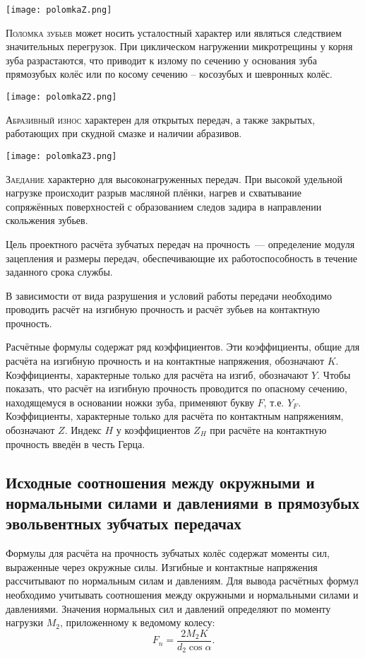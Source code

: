 \begin{marginfigure}
	\texttt{[image: polomkaZ.png]}
\end{marginfigure}
\textsc{Поломка зубьев} может носить усталостный характер или являться следствием значительных перегрузок. При циклическом нагружении микротрещины у корня зуба разрастаются, что приводит к излому по сечению у основания зуба прямозубых колёс или по косому сечению – косозубых и шевронных колёс.

\begin{marginfigure}
	\texttt{[image: polomkaZ2.png]}
\end{marginfigure}
\textsc{Абразивный износ} характерен для открытых передач, а также закрытых, работающих при скудной смазке и наличии абразивов.

\begin{marginfigure}
	\texttt{[image: polomkaZ3.png]}
\end{marginfigure}
\textsc{Заедание} характерно для высоконагруженных передач. При высокой удельной нагрузке происходит разрыв масляной плёнки, нагрев и схватывание сопряжённых поверхностей с образованием следов задира в направлении скольжения зубьев.

Цель проектного расчёта зубчатых передач на прочность~--- определение модуля зацепления и размеры передач, обеспечивающие их работоспособность в течение заданного срока службы. 

В зависимости от вида разрушения и условий работы передачи необходимо проводить расчёт на изгибную прочность и расчёт зубьев на контактную прочность.

Расчётные формулы содержат ряд коэффициентов.
Эти коэффициенты, общие для расчёта на изгибную прочность и на контактные напряжения, обозначают $ K $.
Коэффициенты, характерные только для расчёта на изгиб, обозначают $ Y $.
Чтобы показать, что расчёт на изгибную прочность проводится по опасному сечению, находящемуся в основании ножки зуба, применяют букву $ F $, т.е. $ Y_F $.
Коэффициенты, характерные только для расчёта по контактным напряжениям, обозначают $ Z $.
Индекс $ H $ у коэффициентов $ Z_H $ при расчёте на контактную прочность введён в честь Герца.
\subsection{Исходные соотношения между окружными и нормальными силами и давлениями в прямозубых эвольвентных зубчатых передачах}
Формулы для расчёта на прочность зубчатых колёс содержат моменты сил, выраженные через окружные силы.
Изгибные и контактные напряжения рассчитывают по нормальным силам и давлениям.
Для вывода расчётных формул необходимо учитывать соотношения между окружными и нормальными силами и давлениями.
Значения нормальных сил и давлений определяют по моменту нагрузки $ M_2 $, приложенному к ведомому колесу:
\begin{equation}
F_n = \dfrac{2 M_2 K}{d_2 \cos\alpha}.
\end{equation}



